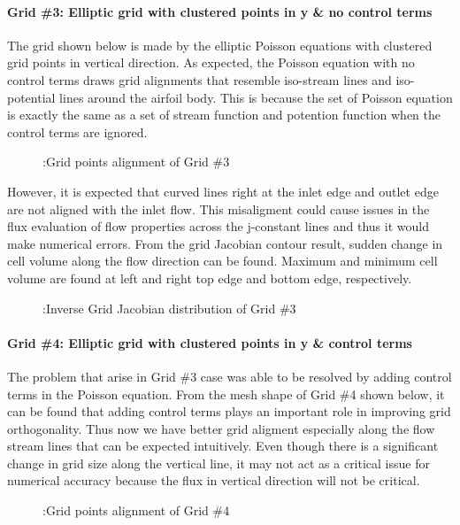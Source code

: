\documentclass[letterpaper,10pt,english]{sphinxmanual}
\begin{document}
\paragraph{Grid \#3: Elliptic grid with clustered points in y \& no control terms}
\label{\detokenize{cases/grid_af:grid-3-elliptic-grid-with-clustered-points-in-y-no-control-terms}}
The grid shown below is made by the elliptic Poisson equations with clustered grid points in vertical direction. As expected, the Poisson equation with no control terms draws grid alignments that resemble iso-stream lines and iso-potential lines around the airfoil body. This is because the set of Poisson equation is exactly the same as a set of stream function and potention function when the control terms are ignored.
\begin{figure}[htbp]
\centering
\capstart

\noindent{}
\caption{:Grid points alignment of Grid \#3}\label{\detokenize{cases/grid_af:id5}}\end{figure}

However, it is expected that curved lines right at the inlet edge and outlet edge are not aligned with the inlet flow. This misaligment could cause issues in the flux evaluation of flow properties across the j-constant lines and thus it would make numerical errors. From the grid Jacobian contour result, sudden change in cell volume along the flow direction can be found. Maximum and minimum cell volume are found at left and right top edge and bottom edge, respectively.
\begin{figure}[htbp]
\centering
\capstart

\noindent{}
\caption{:Inverse Grid Jacobian distribution of Grid \#3}\label{\detokenize{cases/grid_af:id6}}\end{figure}


\paragraph{Grid \#4: Elliptic grid with clustered points in y \& control terms}
\label{\detokenize{cases/grid_af:grid-4-elliptic-grid-with-clustered-points-in-y-control-terms}}
The problem that arise in Grid \#3 case was able to be resolved by adding control terms in the Poisson equation. From the mesh shape of Grid \#4 shown below, it can be found that adding control terms plays an important role in improving grid orthogonality. Thus now we have better grid aligment especially along the flow stream lines that can be expected intuitively. Even though there is a significant change in grid size along the vertical line, it may not act as a critical issue for numerical accuracy because the flux in vertical direction will not be critical.
\begin{figure}[htbp]
\centering
\capstart

\noindent{}
\caption{:Grid points alignment of Grid \#4}\label{\detokenize{cases/grid_af:id7}}\end{figure}
\end{document}
